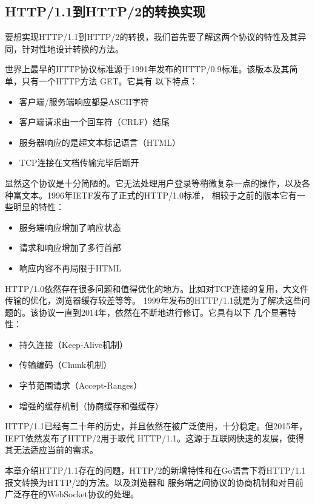 \documentclass[twoside]{CUGThesis}
\begin{document}
	\begin{spacing}{2}
		\section{HTTP/1.1到HTTP/2的转换实现}
	\end{spacing}
	要想实现HTTP/1.1到HTTP/2的转换，我们首先要了解这两个协议的特性及其异同，针对性地设计转换的方法。\par
	世界上最早的HTTP协议标准源于1991年发布的HTTP/0.9标准。该版本及其简单，只有一个HTTP方法 GET。它具有
	以下特点：
	\begin{itemize}
		\item 客户端/服务端响应都是ASCII字符
		\item 客户端请求由一个回车符（CRLF）结尾
		\item 服务器响应的是超文本标记语言（HTML）
		\item TCP连接在文档传输完毕后断开
	\end{itemize}
	\par
	显然这个协议是十分简陋的。它无法处理用户登录等稍微复杂一点的操作，以及各种富文本。1996年IETF发布了正式的HTTP/1.0标准，
	相较于之前的版本它有一些明显的特性：
	\begin{itemize}
		\item 服务端响应增加了响应状态
		\item 请求和响应增加了多行首部
		\item 响应内容不再局限于HTML
	\end{itemize}
	\par
	HTTP/1.0依然存在很多问题和值得优化的地方。比如对TCP连接的复用，大文件传输的优化，浏览器缓存较差等等。
	1999年发布的HTTP/1.1就是为了解决这些问题的\cite{darwish2016impact}。该协议一直到2014年，依然在不断地进行修订。它具有以下
	几个显著特性：
	\begin{itemize}
		\item 持久连接（Keep-Alive机制）
		\item 传输编码（Chunk机制）
		\item 字节范围请求（Accept-Ranges）
		\item 增强的缓存机制（协商缓存和强缓存）
	\end{itemize}
	\par
	HTTP/1.1已经有二十年的历史，并且依然在被广泛使用，十分稳定。但2015年，IEFT依然发布了HTTP/2用于取代
	HTTP/1.1。这源于互联网快速的发展，使得其无法适应当前的需求。\par 
	本章介绍HTTP/1.1存在的问题，HTTP/2的新增特性和在Go语言下将HTTP/1.1报文转换为HTTP/2的方法。以及浏览器和
	服务端之间协议的协商机制和对目前广泛存在的WebSocket协议的处理。
\end{document}
